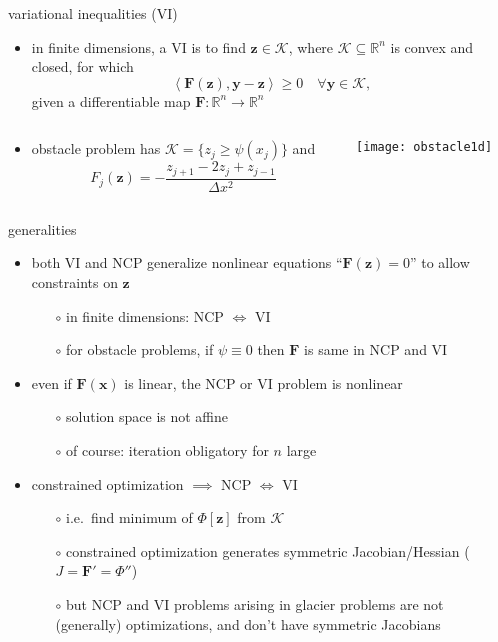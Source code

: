 \documentclass{beamer}
\newcommand\bx{\mathbf{x}}
\newcommand\by{\mathbf{y}}
\newcommand\bz{\mathbf{z}}
\newcommand\bF{\mathbf{F}}
\newcommand\RR{\mathbb{R}}
\newcommand{\ip}[2]{\ensuremath{\left<#1,#2\right>}}
\begin{document}
\begin{frame}{variational inequalities (VI)}

\begin{itemize}
\item in finite dimensions, a VI is to find $\bz\in\mathcal{K}$, where $\mathcal{K}\subseteq \RR^n$ is convex and closed, for which
\begin{equation}
     \ip{\bF(\bz)}{\by-\bz} \ge 0 \quad \forall \by \in \mathcal{K},
\end{equation}
given a differentiable map $\bF:\RR^n \to \RR^n$
\end{itemize}

\begin{columns}
\begin{column}{0.5\textwidth}
\small
\begin{itemize}
\item obstacle problem has $\mathcal{K} = \{z_j \ge \psi(x_j)\}$ and
  $$F_j(\bz) = - \frac{z_{j+1} - 2 z_j + z_{j-1}}{\Delta x^2}$$
\end{itemize}
\end{column}
\begin{column}{0.5\textwidth}
\texttt{[image: obstacle1d]}
\end{column}
\end{columns}\end{frame}


\begin{frame}{generalities}

\begin{itemize}
\item both VI and NCP generalize nonlinear equations ``$\bF(\bz)=0$'' to allow constraints on $\bz$
  \begin{itemize}
  \item[$\circ$]  in finite dimensions: NCP $\iff$ VI
  \item[$\circ$]  for obstacle problems, if $\psi\equiv 0$ then $\bF$ is same in NCP and VI
  \end{itemize}
\item even if $\bF(\bx)$ is linear, the NCP or VI problem is nonlinear
  \begin{itemize}
  \item[$\circ$]  solution space is not affine
  \item[$\circ$]  of course: iteration obligatory for $n$ large
  \end{itemize}
\item constrained optimization $\implies$ NCP $\iff$ VI
  \begin{itemize}
  \item[$\circ$]  i.e.~find minimum of $\Phi[\bz]$ from $\mathcal{K}$
  \item[$\circ$]  constrained optimization generates symmetric Jacobian/Hessian ($J = \bF' = \Phi''$)
  \item[$\circ$]  \alert{but} NCP and VI problems arising in glacier problems are not (generally) optimizations, and don't have symmetric Jacobians
  \end{itemize}
\end{itemize}
\end{frame}
\end{document}
